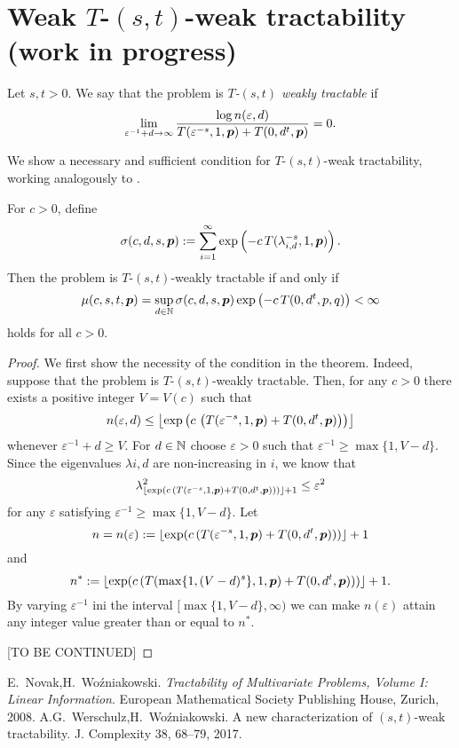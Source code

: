\documentclass[11pt,a4paper]{article}
\newcommand{\peter}[1]{\begingroup\color{purple}#1\endgroup}
\begin{document}
\peter{
\section{Weak $T$-$(s,t)$-weak tractability (work in progress)} \label{sec:weak}

\begin{definition}[$T$-$(s,t)$-weak tractability]
Let $s,t>0$. We say that the problem is \emph{$T$-$(s,t)$ weakly tractable} if
    \[\lim_{\varepsilon^{-1}+d\rightarrow \infty} \frac{\log n(\varepsilon,d)}{T(\varepsilon^{-s},1,\boldsymbol{p}) + T(0,d^t,\boldsymbol{p})} = 0.\]
\end{definition}

We show a necessary and sufficient condition for $T$-$(s,t)$-weak tractability, working analogously to \cite{WW17}.
\begin{theorem}\label{thm:weak}
For $c>0$, define
\[
\sigma (c,d,s,\boldsymbol{p}):= \sum_{i=1}^\infty \exp \left(-c\, T(\lambda_{i,d}^{-s},1,\boldsymbol{p})\right).
\]
Then the problem is $T$-$(s,t)$-weakly tractable if and only if
\[
\mu (c,s,t,\boldsymbol{p})=\sup_{d\in\mathbb{N}} \sigma (c,d,s,\boldsymbol{p}) \exp\left(-c\, T(0,d^t,p,q)\right)<\infty
\]
holds for all $c>0$.
\end{theorem}
\begin{proof}
 We first show the necessity of the condition in the theorem.   Indeed, suppose that the problem is  $T$-$(s,t)$-weakly tractable. Then, for any $c>0$ there exists a positive integer $V=V(c)$ such that  
 \[
 n(\varepsilon,d)\le 
 \left\lfloor \exp\left(c\,
 \left(T(\varepsilon^{-s},1,\boldsymbol{p}) + T(0,d^t,\boldsymbol{p})\right)
 \right) \right\rfloor
 \]
 whenever $\varepsilon^{-1} + d \ge V$. For $d\in\mathbb{N}$ 
 choose $\varepsilon>0$ such that $\varepsilon^{-1}\ge \max\{1,V-d\}$. Since the eigenvalues $\lambda{i,d}$ are non-increasing in $i$, we know that
 \[
 \lambda_{\lfloor \exp(c\,
 (T(\varepsilon^{-s},1,\boldsymbol{p}) + T(0,d^t,\boldsymbol{p}))) \rfloor+1}^2 \le \varepsilon^2
 \]
 for any $\varepsilon$ satisfying $\varepsilon^{-1}\ge \max\{1,V-d\}$.
Let 
\[
n=n(\varepsilon):= \lfloor \exp(c\,
 (T(\varepsilon^{-s},1,\boldsymbol{p}) + T(0,d^t,\boldsymbol{p}))) \rfloor+1
\]
and
\[
n^*:= \lfloor \exp(c\,
 (T(\max\{1,(V-d)^s\},1,\boldsymbol{p}) + T(0,d^t,\boldsymbol{p}))) \rfloor+1.
\]
By varying $\varepsilon^{-1}$ ini the interval 
$[\max\{1,V-d\},\infty)$ we can make $n(\varepsilon)$ attain 
any integer value greater than or equal to $n^*$.

[TO BE CONTINUED]
 
\end{proof}
}


\begin{thebibliography}{99}

 E.~Novak,H.~Wo\'zniakowski. \textit{Tractability of Multivariate Problems, Volume I: Linear Information}.
European Mathematical Society Publishing House, Zurich, 2008.
  A.G.~Werschulz,H.~Wo\'zniakowski. A new characterization of $(s,t)$-weak tractability. J. Complexity 38, 68--79, 2017. 
\end{thebibliography}
\end{document}
